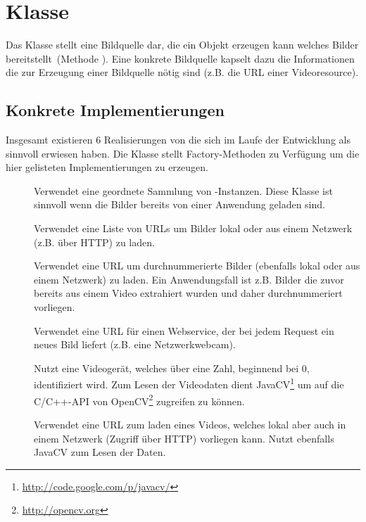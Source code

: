 \section{Klasse }
Das Klasse  stellt eine Bildquelle dar, die ein Objekt erzeugen kann welches Bilder bereitstellt~(Methode ).
Eine konkrete Bildquelle kapselt dazu die Informationen die zur Erzeugung einer Bildquelle nötig sind (z.B. die URL einer Videoresource).


\subsection*{Konkrete Implementierungen}
Insgesamt existieren 6 Realisierungen von  die sich im Laufe der Entwicklung als sinnvoll erwiesen haben.
Die Klasse  stellt Factory-Methoden zu Verfügung um die hier gelisteten Implementierungen zu erzeugen.

{
\setlength{\leftmargini}{1.5em}
\setlength{\labelsep}{\textwidth}
\begin{description}
  \item[]
    Verwendet eine geordnete Sammlung von -Instanzen.
    Diese Klasse ist sinnvoll wenn die Bilder bereits von einer Anwendung geladen sind.
  \item[]
    Verwendet eine Liste von URLs um Bilder lokal oder aus einem Netzwerk (z.B. über HTTP) zu laden.
  \item[]
    Verwendet eine URL um durchnummerierte Bilder (ebenfalls lokal oder aus einem Netzwerk) zu laden.
    Ein Anwendungsfall ist z.B. Bilder die zuvor bereits aus einem Video extrahiert wurden und daher durchnummeriert vorliegen.
  \item[]
    Verwendet eine URL für einen Webservice, der bei jedem Request ein neues Bild liefert (z.B. eine Netzwerkwebcam).
  \item[]
    Nutzt eine Videogerät, welches über eine Zahl, beginnend bei 0, identifiziert wird.
    Zum Lesen der Videodaten dient JavaCV\footnote{\url{http://code.google.com/p/javacv/}} um auf die C/C++-API von OpenCV\footnote{\url{http://opencv.org}} zugreifen zu können.
  \item[]
    Verwendet eine URL zum laden eines Videos, welches lokal aber auch in einem Netzwerk (Zugriff über HTTP) vorliegen kann.
    Nutzt ebenfalls JavaCV zum Lesen der Daten.
\end{description}
}

